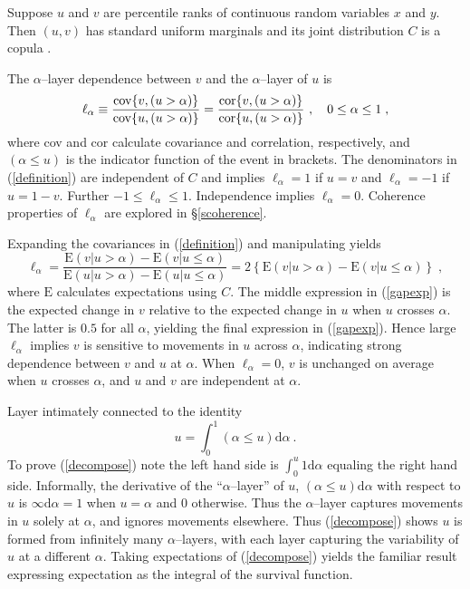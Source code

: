 \documentclass[authoryear]{elsarticle}
\newcommand{\cov}{{\rm cov}}
\newcommand{\E}{{\mathrm E}}
\newcommand{\cor}{\mathrm{cor}}
\newcommand{\de}{\mathrm{d}}
\newcommand{\cq}{\ ,\quad }
\newcommand{\eref}[1]{(\ref{#1})}
\newcommand{\sref}[1]{\S\ref{#1}}
\begin{document}
Suppose $u$ and $v$ are percentile ranks of continuous random variables $x$ and $y$.  Then $(u,v)$ has standard uniform marginals and its joint distribution $C$ is a copula \citep{nelson1999ic}. 

The $\alpha$--layer dependence  between $v$ and the $\alpha$--layer of $u$ is
\begin{equation}\label{definition}
\ell_\alpha \equiv \frac{\cov\{v,(u>\alpha)\}}{\cov\{u,(u>\alpha)\}}
=\frac{\cor\{v,(u>\alpha)\}}{\cor\{u,(u>\alpha)\}} \cq 0\leq\alpha\leq 1\;,
\end{equation}
where cov and cor calculate covariance and correlation, respectively, and $(\alpha\le u)$ is the indicator function of the event in brackets. The denominators in \eref{definition} are independent of $C$ and implies $\ell_\alpha=1$ if $u=v$ and $\ell_\alpha=-1$ if $u=1-v$.  Further $-1\leq \ell_\alpha \leq 1$. Independence implies $\ell_\alpha=0$. Coherence properties of $\ell_\alpha$ are explored in \sref{scoherence}.

Expanding the covariances  in \eref{definition} and manipulating yields
\begin{equation}\label{gapexp}
\ell_\alpha = \frac{\E(v|u>\alpha)-\E(v|u\leq \alpha)}{\E(u|u>\alpha)-\E(u|u\leq \alpha)}
=2 \left\{\E(v|u>\alpha)-\E(v|u\leq \alpha)\right\}\;,
\end{equation}
where $\E$ calculates expectations using $C$. The middle expression in \eref{gapexp} is the expected change in $v$ relative to the expected change in $u$ when $u$ crosses $\alpha$. The latter is $0.5$ for all $\alpha$, yielding the final expression in \eref{gapexp}. Hence large $\ell_\alpha$ implies $v$ is sensitive to movements in $u$ across $\alpha$, indicating strong dependence between $v$ and $u$ at $\alpha$. When $\ell_\alpha=0$, $v$ is unchanged on average when $u$ crosses $\alpha$, and $u$ and $v$ are independent at $\alpha$.

Layer intimately connected to the identity
\begin{equation}\label{decompose}
u= \int_0^1 (\alpha\le u)\de\alpha\ .
\end{equation}
 To prove \eref{decompose} note the left hand side is $\int_0^u 1\de \alpha$ equaling the right hand side.  Informally, the derivative of the  ``$\alpha$--layer'' of $u$,  $(\alpha\le u) \de \alpha$ with respect to $u$ is $\infty\de\alpha=1$ when $u=\alpha$ and $0$ otherwise. Thus the $\alpha$--layer captures movements in $u$ solely at $\alpha$, and ignores movements elsewhere. Thus \eref{decompose} shows $u$ is formed from infinitely many $\alpha$--layers, with each layer capturing the variability of $u$ at a different $\alpha$.  Taking expectations of \eref{decompose} yields the familiar result expressing expectation as the integral of the survival function.
\end{document}
